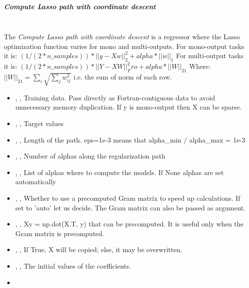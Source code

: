 \subparagraph{Compute Lasso path with coordinate descent}
\mbox{}
\\The \textit{Compute Lasso path with coordinate descent} is a regressor where
the Lasso optimization function varies for mono and multi-outputs.
%
For mono-output tasks it is:
$(1 / (2 * n\_samples)) * ||y - Xw||^2_2 + alpha * ||w||_1$
For multi-output tasks it is:
$(1 / (2 * n\_samples)) * ||Y - XW||^2_Fro + alpha * ||W||_21$
Where:
$||W||_21 = \sum_i \sqrt{\sum_j w_{ij}^2}$
i.e. the sum of norm of each row.
%
\begin{itemize}
  \item {} , ,
  Training data.
  Pass directly as Fortran-contiguous data to avoid unnecessary memory
  duplication.
  If y is mono-output then X can be sparse.
  \item {} , ,
  Target values
  \item {} , ,
  Length of the path.
  eps=1e-3 means that alpha\_min / alpha\_max = 1e-3
  \item {} , ,
  Number of alphas along the regularization path
  \item {} , ,
  List of alphas where to compute the models.
  If None alphas are set automatically
  \item {} , ,
  Whether to use a precomputed Gram matrix to speed up calculations.
  If set to 'auto' let us decide.
  The Gram matrix can also be passed as argument.
  \item {} , ,
  Xy = np.dot(X.T, y) that can be precomputed.
  It is useful only when the Gram matrix is precomputed.
  \item {} , ,
  If True, X will be copied; else, it may be overwritten.
  \item {} , ,
  The initial values of the coefficients.
  \item \verDescriptionB
\end{itemize}

